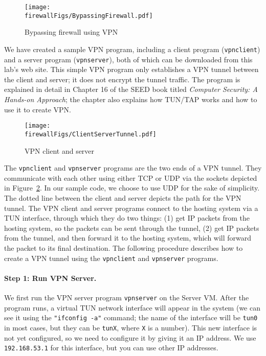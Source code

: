 \begin{figure}[htb]
\begin{center}
\texttt{[image: \\firewallFigs/BypassingFirewall.pdf]}
\end{center}
\caption{Bypassing firewall using VPN}
\label{vpn_firewall:fig:bypassing}
\end{figure}
 


We have created a sample VPN program, including a client program (\texttt{vpnclient})  and
a server program (\texttt{vpnserver}), both of which can be downloaded from
this lab's web site. This simple VPN program only establishes a VPN tunnel 
between the client and server; it does not encrypt the tunnel traffic.
The program is explained in detail in Chapter 16 of the SEED book titled
\textit{Computer Security: A Hands-on Approach}; the chapter also
explains how TUN/TAP works and how to use it to create VPN.


\begin{figure}[htb]
\begin{center}
\texttt{[image: \\firewallFigs/ClientServerTunnel.pdf]}
\end{center}
\caption{VPN client and server}
\label{vpn_firewall:fig:client_server}
\end{figure}

The \texttt{vpnclient} and \texttt{vpnserver} programs are the two ends of
a VPN tunnel. They communicate with each other using either TCP or UDP via the sockets
depicted in Figure~\ref{vpn_firewall:fig:client_server}. In our sample code, we choose
to use UDP for the sake of simplicity.  The dotted line between the
client and server depicts the path for the VPN tunnel.
The VPN client and server programs connect to the hosting system via a
TUN interface, through which they do two things: (1) get IP packets from
the hosting system, so the packets can be sent through the tunnel, (2) get IP packets from the
tunnel, and then forward it to the hosting system, which will forward the
packet to its final destination.
The following procedure describes how to create a VPN tunnel
using the \texttt{vpnclient} and \texttt{vpnserver} programs.


\paragraph{Step 1: Run VPN Server.}
We first run the VPN server program \texttt{vpnserver} on the Server VM.
After the program runs, a virtual TUN network interface will appear
in the system (we can see it using the \texttt{"ifconfig -a"} command; the name of the
interface will be \texttt{tun0} in most cases, but they can be
\texttt{tunX}, where \texttt{X} is a number).
This new interface is not yet configured, so we need to configure it by giving it an IP
address. We use \texttt{192.168.53.1} for this interface, but you can use 
other IP addresses. 


